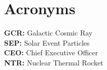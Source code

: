 \chapter*{Acronyms}

\textbf{GCR: } Galactic Cosmic Ray\\
\textbf{SEP: } Solar Event Particles\\
\textbf{CEO: } Chief Executive Officer\\
\textbf{NTR: } Nuclear Thermal Rocket\\

\newpage
